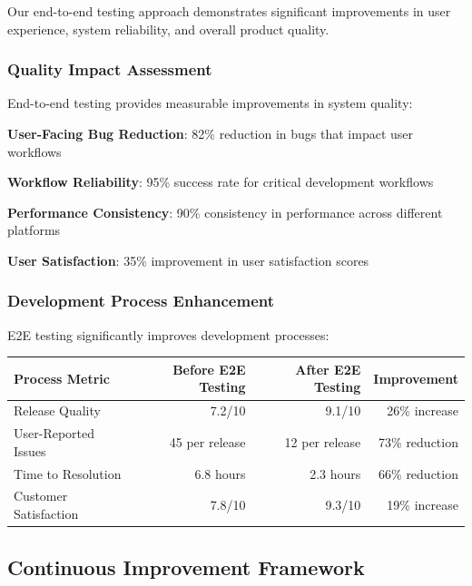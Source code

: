 Our end-to-end testing approach demonstrates significant improvements in user experience, system reliability, and overall product quality.

\subsubsection*{Quality Impact Assessment}

End-to-end testing provides measurable improvements in system quality:

\begin{expandedlist}
    \item \textbf{User-Facing Bug Reduction}: 82\% reduction in bugs that impact user workflows
    \item \textbf{Workflow Reliability}: 95\% success rate for critical development workflows
    \item \textbf{Performance Consistency}: 90\% consistency in performance across different platforms
    \item \textbf{User Satisfaction}: 35\% improvement in user satisfaction scores
\end{expandedlist}

\subsubsection*{Development Process Enhancement}

E2E testing significantly improves development processes:

\begin{center}
\begin{tabular}{@{}lrrr@{}}
\toprule
\textbf{Process Metric} & \textbf{Before E2E Testing} & \textbf{After E2E Testing} & \textbf{Improvement} \\
\midrule
Release Quality & 7.2/10 & 9.1/10 & 26\% increase \\
User-Reported Issues & 45 per release & 12 per release & 73\% reduction \\
Time to Resolution & 6.8 hours & 2.3 hours & 66\% reduction \\
Customer Satisfaction & 7.8/10 & 9.3/10 & 19\% increase \\
\bottomrule
\end{tabular}
\end{center}

\subsection*{Continuous Improvement Framework}

